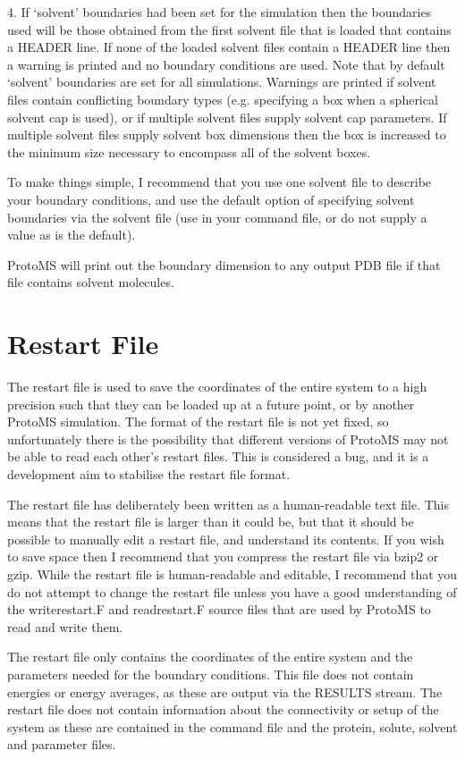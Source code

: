 \documentclass[letterpaper,10pt,english]{sphinxmanual}
\begin{document}
4. If ‘solvent’ boundaries had been set for the simulation then the boundaries used will be those obtained from the first solvent file that is loaded that contains a HEADER line. If none of the loaded solvent files contain a HEADER line then a warning is printed and no boundary conditions are used. Note that by default ‘solvent’ boundaries are set for all simulations.
Warnings are printed if solvent files contain conflicting boundary types (e.g. specifying a box when a spherical solvent cap is used), or if multiple solvent files supply solvent cap parameters. If multiple solvent files supply solvent box dimensions then the box is increased to the minimum size necessary to encompass all of the solvent boxes.

To make things simple, I recommend that you use one solvent file to describe your boundary conditions, and use the default option of specifying solvent boundaries via the solvent file (use  in your command file, or do not supply a  value as  is the default).

ProtoMS will print out the boundary dimension to any output PDB file if that file contains solvent molecules.


\section{Restart File}
\label{protoms:restart-file}
The restart file is used to save the coordinates of the entire system to a high precision such that they can be loaded up at a future point, or by another ProtoMS simulation. The format of the restart file is not yet fixed, so unfortunately there is the possibility that different versions of ProtoMS may not be able to read each other’s restart files. This is considered a bug, and it is a development aim to stabilise the restart file format.

The restart file has deliberately been written as a human-readable text file. This means that the restart file is larger than it could be, but that it should be possible to manually edit a restart file, and understand its contents. If you wish to save space then I recommend that you compress the restart file via bzip2 or gzip. While the
restart file is human-readable and editable, I recommend that you do not attempt to change the restart file unless you have a good understanding of the writerestart.F and readrestart.F source files that are used by ProtoMS to read and write them.

The restart file only contains the coordinates of the entire system and the parameters needed for the boundary conditions. This file does not contain energies or energy averages, as these are output via the RESULTS stream. The restart file does not contain information about the connectivity or setup of the system as these are contained in the command file and the protein, solute, solvent and parameter files.
\end{document}
